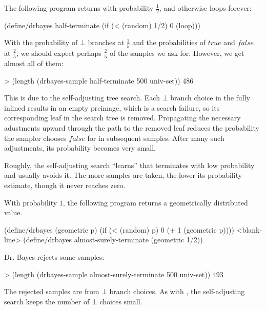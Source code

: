 The following program returns  with probability $\frac{1}{2}$, and otherwise loops forever:
\begin{center}\singlespacing
\begin{schemedisplay}
(define/drbayes half-terminate
  (if (< (random) 1/2) 0 (loop)))
\end{schemedisplay}
\end{center}
With the probability of $\bot$ branches at $\frac{1}{5}$ and the probabilities of $true$ and $false$ at $\frac{2}{5}$, we should expect perhaps $\frac{2}{5}$ of the samples we ask for.
However, we get almost all of them:
\begin{center}\singlespacing
\begin{schemedisplay}
> (length (drbayes-sample half-terminate 500 univ-set))
486
\end{schemedisplay}
\end{center}
This is due to the self-adjusting tree search.
Each $\bot$ branch choice in the fully inlined  results in an empty preimage, which is a search failure, so its corresponding leaf in the search tree is removed.
Propagating the necessary adustments upward through the path to the removed leaf reduces the probability the sampler chooses $false$ for  in subsequent samples.
After many such adjustments, its probability becomes very small.

Roughly, the self-adjusting search ``learns'' that  terminates with low probability and usually avoids it.
The more samples are taken, the lower its probability estimate, though it never reaches zero.

With probability $1$, the following program returns a geometrically distributed value.
\begin{center}\singlespacing
\begin{schemedisplay}
(define/drbayes (geometric p)
  (if (< (random) p) 0 (+ 1 (geometric p))))
<blank-line>
(define/drbayes almost-surely-terminate
  (geometric 1/2))
\end{schemedisplay}
\end{center}
Dr. Bayes rejects some samples:
\begin{center}\singlespacing
\begin{schemedisplay}
> (length (drbayes-sample almost-surely-terminate 500 univ-set))
493
\end{schemedisplay}
\end{center}
The rejected samples are from $\bot$ branch choices.
As with , the self-adjusting search keeps the number of $\bot$ choices small.

